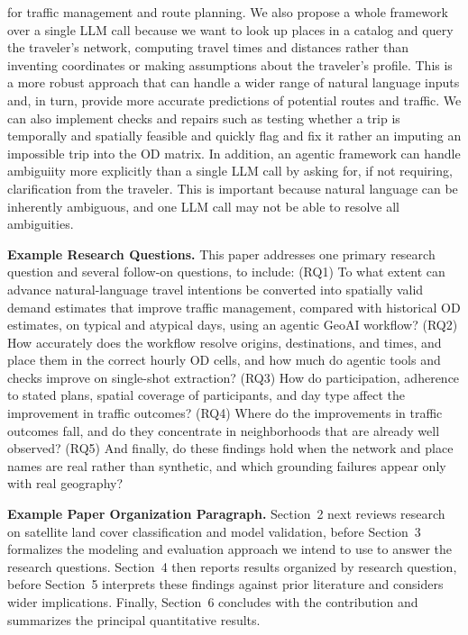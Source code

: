 \documentclass[11pt,letterpaper]{article}
\begin{document}
for traffic management and route planning. We also propose a whole framework over a single LLM call because we want to look up places in a catalog 
and query the traveler's network, computing travel times and distances rather than inventing coordinates or making assumptions about the traveler's profile. 
This is a more robust approach that can handle a wider range of natural language inputs and, in turn, provide more accurate predictions of 
potential routes and traffic. We can also implement checks and repairs such as testing whether a trip is temporally and spatially 
feasible and quickly flag and fix it rather an imputing an impossible trip into the OD matrix. In addition, an agentic framework can handle 
ambiguiity more explicitly than a single LLM call by asking for, if not requiring, clarification from the traveler. This is important because 
natural language can be inherently ambiguous, and one LLM call may not be able to resolve all ambiguities.


\textbf{Example Research Questions.} This paper addresses one primary research question and several follow-on questions, 
to include: (RQ1) To what extent can advance natural-language travel intentions be converted into spatially valid demand 
estimates that improve traffic management, compared with historical OD estimates, on typical and atypical days, using an agentic GeoAI workflow?
(RQ2) How accurately does the workflow resolve origins, destinations, and times, and place them in the correct hourly OD cells, 
and how much do agentic tools and checks improve on single-shot extraction? (RQ3) How do participation, adherence to stated plans, 
spatial coverage of participants, and day type affect the improvement in traffic outcomes? (RQ4) Where do the improvements in traffic outcomes fall, 
and do they concentrate in neighborhoods that are already well observed? (RQ5) And finally, do these findings hold when the network and 
place names are real rather than synthetic, and which grounding failures appear only with real geography?

\textbf{Example Paper Organization Paragraph.} Section~2 next reviews research on satellite land cover
classification and model validation, before Section~3 formalizes the modeling and evaluation
approach we intend to use to answer the research questions. Section~4 then reports
results organized by research question, before Section~5 interprets these findings against prior
literature and considers wider implications. Finally, Section~6 concludes with the contribution and
summarizes the principal quantitative results.
\end{document}
